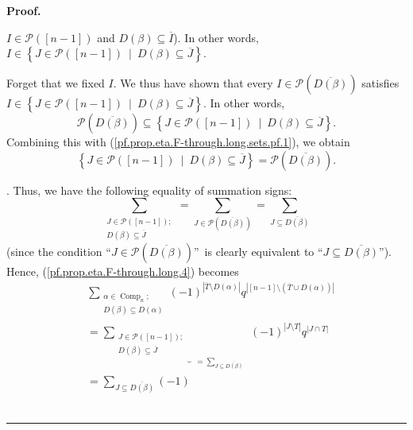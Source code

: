 \documentclass[numbers=enddot,12pt,final,onecolumn,notitlepage]{scrartcl}%
\theoremstyle{definition}
\newenvironment{proof}[1][Proof]{\noindent\textbf{#1.} }{\ \rule{0.5em}{0.5em}}
\let\sumnonlimits\sum
\renewcommand{\sum}{\sumnonlimits\limits}
\newenvironment{verlong}{}{}
\begin{document}
\begin{verlong}
\begin{proof}
{$I\in\mathcal{P}\left(  \left[  n-1\right]  \right)  $ and $D\left(
\beta\right)  \subseteq\overline{I}$). In other words, $I\in\left\{
J\in\mathcal{P}\left(  \left[  n-1\right]  \right)  \ \mid\ D\left(
\beta\right)  \subseteq\overline{J}\right\}  $.
\par
Forget that we fixed $I$. We thus have shown that every $I\in\mathcal{P}%
\left(  \overline{D\left(  \beta\right)  }\right)  $ satisfies $I\in\left\{
J\in\mathcal{P}\left(  \left[  n-1\right]  \right)  \ \mid\ D\left(
\beta\right)  \subseteq\overline{J}\right\}  $. In other words,%
\[
\mathcal{P}\left(  \overline{D\left(  \beta\right)  }\right)  \subseteq
\left\{  J\in\mathcal{P}\left(  \left[  n-1\right]  \right)  \ \mid\ D\left(
\beta\right)  \subseteq\overline{J}\right\}  .
\]
Combining this with (\ref{pf.prop.eta.F-through.long.sets.pf.1}), we obtain%
\[
\left\{  J\in\mathcal{P}\left(  \left[  n-1\right]  \right)  \ \mid\ D\left(
\beta\right)  \subseteq\overline{J}\right\}  =\mathcal{P}\left(
\overline{D\left(  \beta\right)  }\right)  .
\]
}. Thus, we have the following equality of summation signs:
\[
\sum_{\substack{J\in\mathcal{P}\left(  \left[  n-1\right]  \right)
;\\D\left(  \beta\right)  \subseteq\overline{J}}}=\sum_{J\in\mathcal{P}\left(
\overline{D\left(  \beta\right)  }\right)  }=\sum_{J\subseteq\overline
{D\left(  \beta\right)  }}%
\]
(since the condition \textquotedblleft$J\in\mathcal{P}\left(  \overline
{D\left(  \beta\right)  }\right)  $\textquotedblright\ is clearly equivalent
to \textquotedblleft$J\subseteq\overline{D\left(  \beta\right)  }%
$\textquotedblright). Hence, (\ref{pf.prop.eta.F-through.long.4}) becomes%
\begin{align}
&  \sum_{\substack{\alpha\in\operatorname*{Comp}\nolimits_{n};\\D\left(
\beta\right)  \subseteq D\left(  \alpha\right)  }}\left(  -1\right)
^{\left\vert \overline{T}\setminus D\left(  \alpha\right)  \right\vert
}q^{\left\vert \left[  n-1\right]  \setminus\left(  \overline{T}\cup D\left(
\alpha\right)  \right)  \right\vert }\nonumber\\
&  =\underbrace{\sum_{\substack{J\in\mathcal{P}\left(  \left[  n-1\right]
\right)  ;\\D\left(  \beta\right)  \subseteq\overline{J}}}}_{\substack{=\sum
_{J\subseteq\overline{D\left(  \beta\right)  }}}}\left(  -1\right)
^{\left\vert J\setminus T\right\vert }q^{\left\vert J\cap T\right\vert
}\nonumber\\
&  =\sum_{J\subseteq\overline{D\left(  \beta\right)  }}\left(  -1\right)

\end{align}
\end{proof}
\end{verlong}
\end{document}
